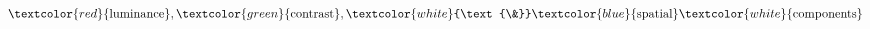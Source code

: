 \documentclass[preview]{standalone}
\begin{document}
\begin{align*}
\textcolor{red}{\text{luminance}},\textcolor{green}{\text{contrast}},\textcolor{white}{\text{\&}}\textcolor{blue}{\text{spatial}}\textcolor{white}{\text{components}}
\end{align*}
\end{document}
